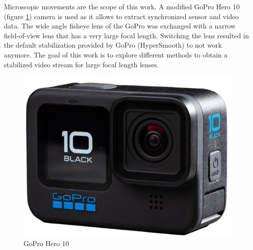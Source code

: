 Microscopic movements are the scope of this work. A modified GoPro Hero 10 (figure \ref{fig:gopro_hero10}) camera is used as it allows to extract synchronized sensor and video data. The wide angle fisheye lens of the GoPro was exchanged with a narrow field-of-view lens that has a very large focal length. Switching the lens resulted in the default stabilization provided by GoPro (HyperSmooth) to not work anymore. The goal of this work is to explore different methods to obtain a stabilized video stream for large focal length lenses.

\begin{figure}[H]
    \centering
    \includegraphics[scale=0.1]{images/fig_chapter1/gopro_hero10.png}
    \caption{GoPro Hero 10}
    \label{fig:gopro_hero10}
\end{figure}






